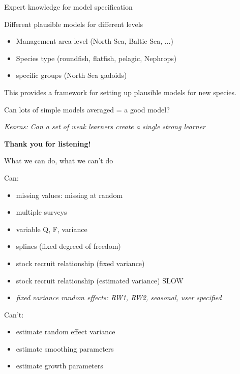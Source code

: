 \documentclass{beamer}\usepackage[]{graphicx}\usepackage[]{color}
\begin{document}
\begin{frame}{Expert knowledge for model specification}

Different plausible models for different levels
\begin{itemize}
\item Management area level (North Sea, Baltic Sea, ...)
\item Species type (roundfish, flatfish, pelagic, Nephrops)
\item specific groups (North Sea gadoids)
\end{itemize}

\vspace{5mm}
This provides a framework for setting up plausible models for new species.

\vspace{5mm}
Can lots of simple models averaged = a good model?

\emph{Kearns: Can a set of weak learners create a single strong learner}

\end{frame}

\begin{frame}{}

\begin{center}
\Large\textbf{Thank you for listening!}
\end{center}

\end{frame}

\begin{frame}{What we can do, what we can't do}

Can:
\begin{itemize}
\item missing values: missing at random
\item multiple surveys
\item variable Q, F, variance
\item splines (fixed degreed of freedom)
\item stock recruit relationship (fixed variance)
\item stock recruit relationship (estimated variance) SLOW
\item \emph{fixed variance random effects: RW1, RW2, seasonal, user specified}
\end{itemize}

Can't:
\begin{itemize}
\item estimate random effect variance
\item estimate smoothing parameters
\item estimate growth parameters
\end{itemize}

\end{frame}
\end{document}
